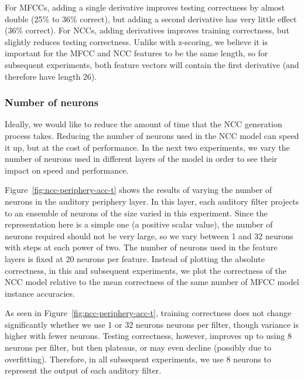 For MFCCs, adding a single derivative
improves testing correctness
by almost double
(25\% to 36\% correct),
but adding a second derivative
has very little effect
(36\% correct).
For NCCs, adding derivatives
improves training correctness,
but slightly reduces testing correctness.
Unlike with z-scoring,
we believe it is important
for the MFCC and NCC features to
be the same length,
so for subsequent experiments,
both feature vectors
will contain the first derivative
(and therefore have length 26).

\subsubsection{Number of neurons}

Ideally,
we would like to reduce the amount of time
that the NCC generation process takes.
Reducing the number of neurons
used in the NCC model
can speed it up,
but at the cost of performance.
In the next two experiments,
we vary the number of neurons used
in different layers of the model
in order to see their impact
on speed and performance.


Figure~\ref{fig:ncc-periphery-acc-t} shows the results of
varying the number of neurons
in the auditory periphery layer.
In this layer,
each auditory filter projects
to an ensemble of neurons
of the size varied in this experiment.
Since the representation here
is a simple one
(a positive scalar value),
the number of neurons required
should not be very large,
so we vary between
1 and 32 neurons with steps
at each power of two.
The number of neurons used
in the feature layers
is fixed at 20 neurons per feature.
Instead of plotting the absolute correctness,
in this and subsequent experiments,
we plot the correctness of the NCC model
relative to the mean correctness
of the same number
of MFCC model instance accuracies.

As seen in Figure~\ref{fig:ncc-periphery-acc-t},
training correctness
does not change significantly
whether we use
1 or 32 neurons neurons per filter,
though variance is higher
with fewer neurons.
Testing correctness,
however, improves up to
using 8 neurons per filter,
but then plateaus,
or may even decline
(possibly due to overfitting).
Therefore, in all
subsequent experiments,
we use 8 neurons to represent
the output of each auditory filter.

